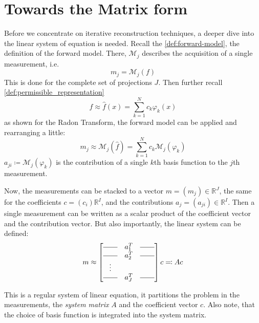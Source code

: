 
\section{Towards the Matrix form}\label{sec:matrix_formulation}

Before we concentrate on iterative reconstruction techniques, a deeper dive into the linear system
of equation is needed. Recall the \autoref{def:forward-model}, the definition of the forward model.
There, \(\mathscr{M}_j\) describes the acquisition of a single measurement, i.e.
\[ m_j = \mathscr{M}_j(f) \]
This is done for the complete set of projections \(J\). Then further recall
\autoref{def:permissible_representation}
\[ f \approx \hat{f}(x) = \sum_{k=1}^{N} c_k \varphi_k(x) \]
as shown for the Radon Transform, the forward model can be applied and rearranging a little:
\[ m_j \approx \mathscr{M}_j(\hat{f}) = \sum_{k=1}^{N} c_k \mathscr{M}_j(\varphi_k) \]
\(a_{ji} \coloneq \mathscr{M}_j(\varphi_k)\) is the contribution of a single \(k\)th basis function
to the \(j\)th measurement.

Now, the measurements can be stacked to a vector \(m = (m_j) \in  \mathbb{R}^J\), the same for
the coefficients \(c = (c_i) \mathbb{R}^I\), and the contributions \(a_{j} = (a_{ji}) \in
\mathbb{R}^I\). Then a single measurement can be written as a scalar product of the coefficient
vector and the contribution vector. But also importantly, the linear system can be defined:
\begin{equation}\label{eq:system_lin_equation}
	m \approx
	\begin{bmatrix}
		\rule[.5ex]{2em}{0.4pt} & a_1^T & \rule[.5ex]{2em}{0.4pt} \\
		\rule[.5ex]{2em}{0.4pt} & a_2^T & \rule[.5ex]{2em}{0.4pt} \\
		\vdots                                                    \\
		\rule[.5ex]{2em}{0.4pt} & a_J^T & \rule[.5ex]{2em}{0.4pt}
	\end{bmatrix} c \eqcolon A c
\end{equation}

This is a regular system of linear equation, it partitions the problem in the measurements, the
\textit{system matrix} \(A\) and the coefficient vector \(c\). Also note, that the choice of basis
function is integrated into the system matrix.

